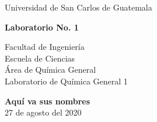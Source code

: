 \documentclass[osajnl,showpacs,superscriptaddress,10pt]{article}
\begin{document}
\begin{center}
\begin{Large}
Universidad de San Carlos de Guatemala
\end{Large}
\end{center}



\begin{center}
\begin{Huge}
\textbf{Laboratorio No. 1}
\end{Huge}
\end{center}



\begin{center}
\begin{normalsize}
Facultad de Ingeniería\\
Escuela de Ciencias\\
Área de Química General\\
Laboratorio de Química General 1\\
\end{normalsize}
\end{center}


\begin{center}
\textbf{Aquí va sus nombres}\\
27 de agosto del 2020
\end{center}



\clearpage



\end{document}
